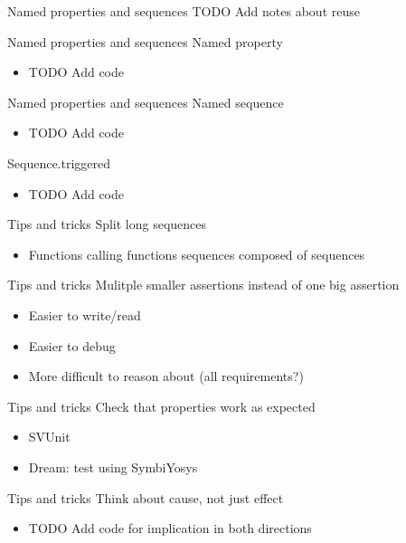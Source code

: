 \documentclass{beamer}
\begin{document}
\begin{frame}{Named properties and sequences}
TODO Add notes about reuse
\end{frame}


\begin{frame}{Named properties and sequences}
Named property
\begin{itemize}
 \item TODO Add code
\end{itemize}
\end{frame}


\begin{frame}{Named properties and sequences}
Named sequence
\begin{itemize}
 \item TODO Add code
\end{itemize}
\end{frame}


\begin{frame}{Sequence.triggered}
\begin{itemize}
 \item TODO Add code
\end{itemize}
\end{frame}


\begin{frame}{Tips and tricks}
Split long sequences

\begin{itemize}
 \item Functions calling functions \textrightarrow{} sequences composed of sequences
\end{itemize}
\end{frame}


\begin{frame}{Tips and tricks}
Mulitple smaller assertions instead of one big assertion

\begin{itemize}
 \item Easier to write/read
 \item Easier to debug
 \item More difficult to reason about (all requirements?)
\end{itemize}
\end{frame}


\begin{frame}{Tips and tricks}
Check that properties work as expected

\begin{itemize}
 \item SVUnit
 \item Dream: test using SymbiYosys
\end{itemize}
\end{frame}


\begin{frame}{Tips and tricks}
Think about cause, not just effect

\begin{itemize}
 \item TODO Add code for implication in both directions
\end{itemize}
\end{frame}
\end{document}
